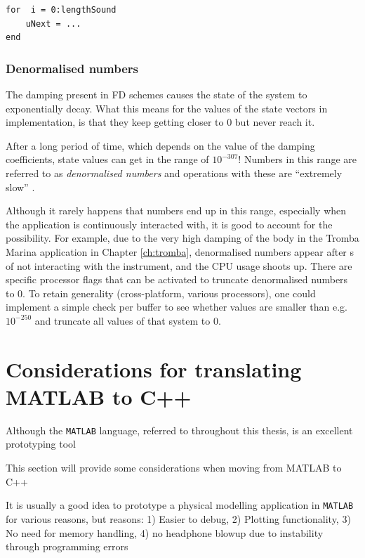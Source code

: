 \setlstMAT
\begin{lstlisting}
for  i = 0:lengthSound
    uNext = ...
end
\end{lstlisting}

\subsubsection{Denormalised numbers}
The damping present in FD schemes causes the state of the system to exponentially decay. What this means for the values of the state vectors in implementation, is that they keep getting closer to $0$ but never reach it. 

After a long period of time, which depends on the value of the damping coefficients, state values can get in the range of \textApprox$10^{-307}$! Numbers in this range are referred to as \textit{denormalised numbers} and operations with these are ``extremely slow'' \cite{CPPdenormalised}.

Although it rarely happens that numbers end up in this range, especially when the application is continuously interacted with, it is good to account for the possibility. For example, due to the very high damping of the body in the Tromba Marina application in Chapter \ref{ch:tromba}, denormalised numbers appear after  s of not interacting with the instrument, and the CPU usage shoots up. There are specific processor flags that can be activated to truncate denormalised numbers to 0. To retain generality (cross-platform, various processors), one could implement a simple check per buffer to see whether values are smaller than e.g. $10^{-250}$ and truncate all values of that system to $0$. 


\section{Considerations for translating MATLAB to C++}
Although the \texttt{MATLAB} language, referred to throughout this thesis, is an excellent prototyping tool

This section will provide some considerations when moving from MATLAB to C++ 

It is usually a good idea to prototype a physical modelling application in \texttt{MATLAB} for various reasons, but  reasons: 1) Easier to debug, 2) Plotting functionality, 3) No need for memory handling, 4) no headphone blowup due to instability through programming errors



